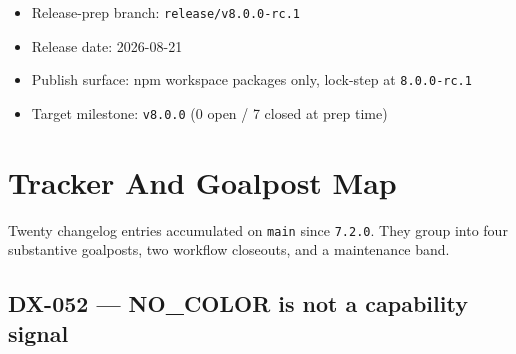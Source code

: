\begin{itemize}
\item
  Release-prep branch: \texttt{r\allowbreak{}e\allowbreak{}l\allowbreak{}e\allowbreak{}a\allowbreak{}s\allowbreak{}e\allowbreak{}/\allowbreak{}v\allowbreak{}8\allowbreak{}.\allowbreak{}0\allowbreak{}.\allowbreak{}0\allowbreak{}-\allowbreak{}r\allowbreak{}c\allowbreak{}.\allowbreak{}1}
\item
  Release date: 2026-08-21
\item
  Publish surface: npm workspace packages only, lock-step at \texttt{8\allowbreak{}.\allowbreak{}0\allowbreak{}.\allowbreak{}0\allowbreak{}-\allowbreak{}r\allowbreak{}c\allowbreak{}.\allowbreak{}1}
\item
  Target milestone: \texttt{v\allowbreak{}8\allowbreak{}.\allowbreak{}0\allowbreak{}.\allowbreak{}0} (0 open / 7 closed at prep time)
\end{itemize}

\section{Tracker And Goalpost Map}\label{record-262-tracker-and-goalpost-map}

Twenty changelog entries accumulated on \texttt{m\allowbreak{}a\allowbreak{}i\allowbreak{}n} since \texttt{7\allowbreak{}.\allowbreak{}2\allowbreak{}.\allowbreak{}0}. They group into four substantive goalposts, two workflow closeouts, and a maintenance band.

\subsection{DX-052 --- NO\_COLOR is not a capability signal}\label{record-262-dx-052-no_color-is-not-a-capability-signal}

